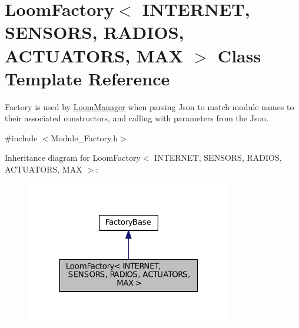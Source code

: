 \hypertarget{class_loom_factory}{}\section{Loom\+Factory$<$ I\+N\+T\+E\+R\+N\+ET, S\+E\+N\+S\+O\+RS, R\+A\+D\+I\+OS, A\+C\+T\+U\+A\+T\+O\+RS, M\+AX $>$ Class Template Reference}
\label{class_loom_factory}


Factory is used by \hyperlink{class_loom_manager}{Loom\+Manager} when parsing Json to match module names to their associated constructors, and calling with parameters from the Json.  




{\ttfamily \#include $<$Module\+\_\+\+Factory.\+h$>$}



Inheritance diagram for Loom\+Factory$<$ I\+N\+T\+E\+R\+N\+ET, S\+E\+N\+S\+O\+RS, R\+A\+D\+I\+OS, A\+C\+T\+U\+A\+T\+O\+RS, M\+AX $>$\+:\nopagebreak
\begin{figure}[H]
\begin{center}
\leavevmode
\includegraphics[width=256pt]{class_loom_factory__inherit__graph}
\end{center}
\end{figure}
